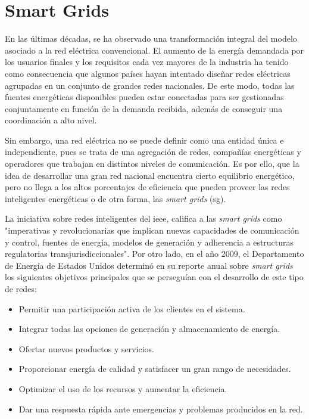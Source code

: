 \section{Smart Grids}
\label{sec:smartgrids}


En las últimas décadas, se ha observado una transformación integral del modelo asociado a la red eléctrica convencional. El aumento de la energía demandada por los usuarios finales y los requisitos cada vez mayores de la industria ha tenido como consecuencia que algunos países hayan intentado diseñar redes eléctricas agrupadas en un conjunto de grandes redes nacionales. De este modo, todas las fuentes energéticas disponibles pueden estar conectadas para ser gestionadas conjuntamente en función de la demanda recibida, además de conseguir una coordinación a alto nivel. \cite{smartgrid_overview}

\vspace{3mm}

Sin embargo, una red eléctrica no se puede definir como una entidad única e independiente, pues se trata de una agregación de redes, compañías energéticas y operadores que trabajan en distintos niveles de comunicación. Es por ello, que la idea de desarrollar una gran red nacional encuentra cierto equilibrio energético, pero no llega a los altos porcentajes de eficiencia que pueden proveer las redes inteligentes energéticas o de otra forma, las \textit{smart grids} (\gls{sg}). 

\vspace{3mm}

La iniciativa sobre redes inteligentes del \gls{ieee}, califica a las \textit{smart grids} \cite{ieee} como "imperativas y revolucionarias que implican nuevas capacidades de comunicación y control, fuentes de energía, modelos de generación y adherencia a estructuras regulatorias transjurisdiccionales". Por otro lado, en el año 2009, el Departamento de Energía de Estados Unidos \cite{us} determinó en su reporte anual sobre \textit{smart grids} los siguientes objetivos principales que se perseguían con el desarrollo de este tipo de redes: 

\pagebreak

\begin{itemize}
  \item Permitir una participación activa de los clientes en el sistema.
  \item Integrar todas las opciones de generación y almacenamiento de energía.
  \item Ofertar nuevos productos y servicios.
  \item Proporcionar energía de calidad y satisfacer un gran rango de necesidades.
  \item Optimizar el uso de los recursos y aumentar la eficiencia.
  \item Dar una respuesta rápida ante emergencias y problemas producidos en la red.
\end{itemize}

